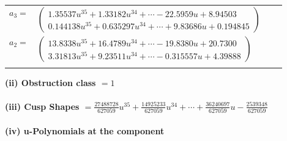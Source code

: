 \documentclass[1p]{elsarticle_modified}
\theoremstyle{definition}
\begin{document}
\begin{tabular}{m{7pt} m{180pt} m{7pt} m{180pt} }
\flushright $a_{3}=$&$\begin{pmatrix}1.35537 u^{35}+1.33182 u^{34}+\cdots-22.5959 u+8.94503\\0.144138 u^{35}+0.635297 u^{34}+\cdots+9.83686 u+0.194845\end{pmatrix}$ \\
\flushright $a_{2}=$&$\begin{pmatrix}13.8338 u^{35}+16.4789 u^{34}+\cdots-19.8380 u+20.7300\\3.31813 u^{35}+9.23511 u^{34}+\cdots-0.315557 u+4.39888\end{pmatrix}$\\&\end{tabular}
\flushleft \textbf{(ii) Obstruction class $= 1$}\\~\\
\flushleft \textbf{(iii) Cusp Shapes $= \frac{27488728}{627059} u^{35}+\frac{14925233}{627059} u^{34}+\cdots+\frac{36240697}{627059} u-\frac{2539348}{627059}$}\\~\\
\newpage\renewcommand{\arraystretch}{1}
\flushleft \textbf{(iv) u-Polynomials at the component}\newline \\
\end{document}
